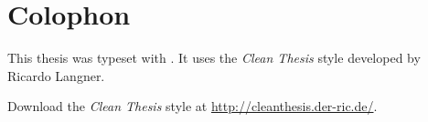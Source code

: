 %
\pagestyle{empty}
\hfill
\vfill
{}
\section*{Colophon}

This thesis was typeset with \LaTeXe.
It uses the \textit{Clean Thesis} style developed by Ricardo Langner.


Download the \textit{Clean Thesis} style at \url{http://cleanthesis.der-ric.de/}.
